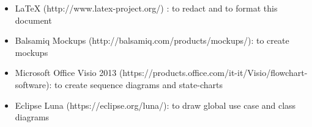 \begin{itemize}
	\item LaTeX (http://www.latex-project.org/) : to redact and to format this document
	\item Balsamiq Mockups (http://balsamiq.com/products/mockups/): to create
	mockups
	\item Microsoft Office Visio 2013 (https://products.office.com/it-it/Visio/flowchart-software): to create sequence diagrams and state-charts
	\item Eclipse Luna (https://eclipse.org/luna/): to draw global use case and class diagrams
\end{itemize}